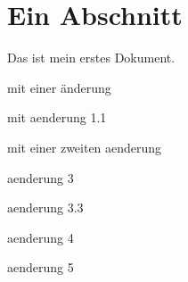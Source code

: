 \documentclass{scrartcl}
\begin{document}
\section{Ein Abschnitt}
Das ist mein erstes Dokument.

mit einer änderung

mit aenderung 1.1

mit einer zweiten aenderung

aenderung 3

aenderung 3.3

aenderung 4

aenderung 5
\end{document}
